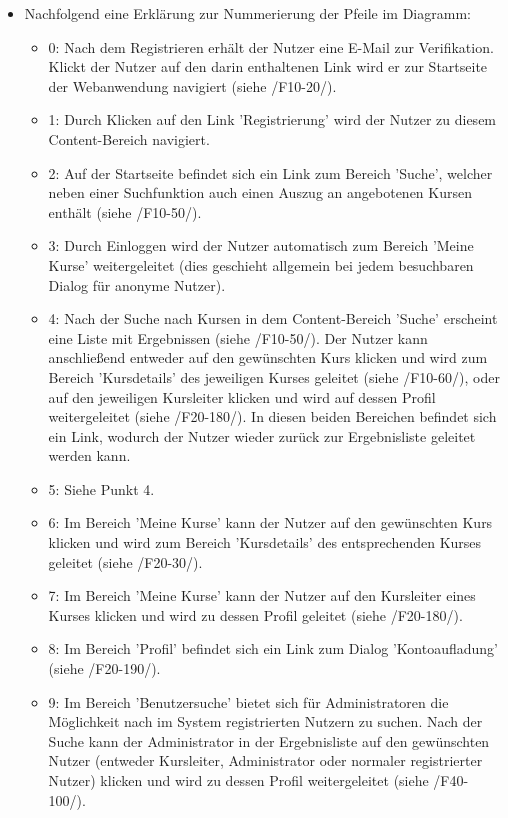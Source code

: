 \documentclass[a4paper]{scrreprt}
\begin{document}
\begin{itemize}
	    \item Nachfolgend eine Erklärung zur Nummerierung der Pfeile im Diagramm:
	    
	    \begin{itemize}
	    \item 0: Nach dem Registrieren erhält der Nutzer eine E-Mail zur Verifikation. Klickt der Nutzer auf den darin enthaltenen Link wird er zur Startseite der Webanwendung navigiert (siehe /F10-20/).
	    \item 1: Durch Klicken auf den Link 'Registrierung' wird der Nutzer zu diesem Content-Bereich navigiert.
	    \item 2: Auf der Startseite befindet sich ein Link zum Bereich 'Suche', welcher neben einer Suchfunktion auch einen Auszug an angebotenen Kursen enthält (siehe /F10-50/).
	    \item 3: Durch Einloggen wird der Nutzer automatisch zum Bereich 'Meine Kurse' weitergeleitet (dies geschieht allgemein bei jedem besuchbaren Dialog für anonyme Nutzer).
	    \item 4: Nach der Suche nach Kursen in dem Content-Bereich 'Suche' erscheint eine Liste mit Ergebnissen (siehe /F10-50/). Der Nutzer kann anschließend entweder auf den gewünschten Kurs klicken und wird zum Bereich 'Kursdetails' des jeweiligen Kurses geleitet (siehe /F10-60/), oder auf den jeweiligen Kursleiter klicken und wird auf dessen Profil weitergeleitet (siehe /F20-180/). In diesen beiden Bereichen befindet sich ein Link, wodurch der Nutzer wieder zurück zur Ergebnisliste geleitet werden kann.
	    \item 5: Siehe Punkt 4.
	    \item 6: Im Bereich 'Meine Kurse' kann der Nutzer auf den gewünschten Kurs klicken und wird zum Bereich 'Kursdetails' des entsprechenden Kurses geleitet (siehe /F20-30/).
	    \item 7: Im Bereich 'Meine Kurse' kann der Nutzer auf den Kursleiter eines Kurses klicken und wird zu dessen Profil geleitet (siehe /F20-180/).
	    \item 8: Im Bereich 'Profil' befindet sich ein Link zum Dialog 'Kontoaufladung' (siehe /F20-190/).
	    \item 9: Im Bereich 'Benutzersuche' bietet sich für Administratoren die Möglichkeit nach im System registrierten Nutzern zu suchen. Nach der Suche kann der Administrator in der Ergebnisliste auf den gewünschten Nutzer (entweder Kursleiter, Administrator oder normaler registrierter Nutzer) klicken und wird zu dessen Profil weitergeleitet  (siehe /F40-100/).

\end{itemize}
\end{itemize}
\end{document}
